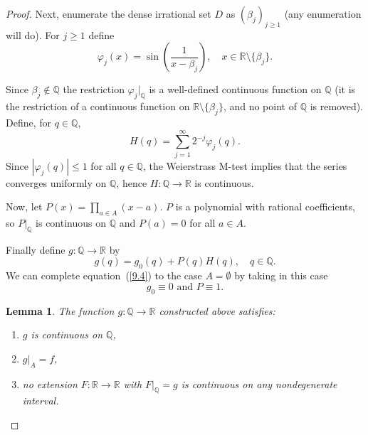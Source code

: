 \documentclass[11pt]{amsart} %
\newtheorem{lemma}[theorem]{Lemma}
\theoremstyle{definition}
\begin{document}
\begin{proof}

Next, enumerate the dense irrational set $D$ as $(\beta_{j})_{j\ge1}$ (any enumeration will do). For $j\ge1$ define
\begin{equation} 
\varphi_{j}(x)=\sin\left(\frac{1}{x-\beta_{j}}\right), \quad x\in\mathbb{R}\setminus\{\beta_{j}\}. \end{equation} 

Since $\beta_{j}\notin\mathbb{Q}$ the restriction $\varphi_{j}|_{\mathbb{Q}}$ is a well-defined continuous function on $\mathbb{Q}$ (it is the restriction of a continuous function on $\mathbb{R}\setminus\{\beta_{j}\}$, and no point of $\mathbb{Q}$ is removed). Define, for $q\in\mathbb{Q}$,
\begin{equation} 
H(q)=\sum_{j=1}^{\infty}2^{-j}\varphi_{j}(q). 
\end{equation} 
Since $|\varphi_{j}(q)|\le1$ for all $q\in\mathbb{Q}$, the Weierstrass M-test implies that the series converges uniformly on $\mathbb{Q}$, hence $H:\mathbb{Q}\rightarrow\mathbb{R}$ is continuous.

\vspace{0.2cm}

Now, let $P(x)=\prod_{a\in A}(x-a).$ $P$ is a polynomial with rational coefficients, so $P|_{\mathbb{Q}}$ is continuous on $\mathbb{Q}$ and $P(a)=0$ for all $a\in A$. 

Finally define $g:\mathbb{Q}\rightarrow\mathbb{R}$ by
\begin{equation} g(q)=g_{0}(q)+P(q)H(q), \quad q\in\mathbb{Q}. 
\label{9.4} 
\end{equation} 
We can complete equation~(\ref{9.4}) to the case $A=\emptyset$ by taking in this case
\begin{equation} 
g_0\equiv 0\mbox{ and }P\equiv 1. 
\end{equation} 

\begin{lemma}
\label{thm:5.5}
The function $g:\mathbb{Q}\rightarrow\mathbb{R}$ constructed above satisfies:
\begin{enumerate}
    \item[(1)] $g$ is continuous on $\mathbb{Q}$,
    \item[(2)] $g|_{A}=f$,
    \item[(3)] no extension $F:\mathbb{R}\rightarrow\mathbb{R}$ with $F|_{\mathbb{Q}}=g$ is continuous on any nondegenerate interval.
\end{enumerate}
\end{lemma}



\end{proof}
\end{document}

